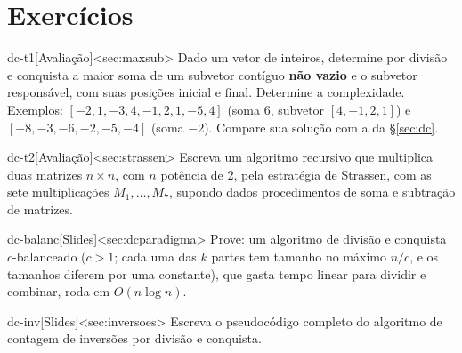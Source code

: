 \section{Exercícios}
\excurso
\begin{exercicio}{dc-t1}[Avaliação]<sec:maxsub>
Dado um vetor de inteiros, determine por divisão e conquista a maior soma de um subvetor contíguo \textbf{não vazio} e o subvetor responsável, com suas posições inicial e final. Determine a complexidade. Exemplos: $[-2,1,-3,4,-1,2,1,-5,4]$ (soma 6, subvetor $[4,-1,2,1]$) e $[-8,-3,-6,-2,-5,-4]$ (soma $-2$). Compare sua solução com a da §\ref{sec:dc}.
\end{exercicio}
\begin{exercicio}{dc-t2}[Avaliação]<sec:strassen>
Escreva um algoritmo recursivo que multiplica duas matrizes $n\times n$, com $n$ potência de 2, pela estratégia de Strassen, com as sete multiplicações $M_1,\dots,M_7$, supondo dados procedimentos de soma e subtração de matrizes.
\end{exercicio}
\begin{exercicio}{dc-balanc}[Slides]<sec:dcparadigma>
Prove: um algoritmo de divisão e conquista $c$-balanceado ($c>1$; cada uma das $k$ partes tem tamanho no máximo $n/c$, e os tamanhos diferem por uma constante), que gasta tempo linear para dividir e combinar, roda em $O(n\log n)$.
\end{exercicio}
\begin{exercicio}{dc-inv}[Slides]<sec:inversoes>
Escreva o pseudocódigo completo do algoritmo de contagem de inversões por divisão e conquista.
\end{exercicio}

